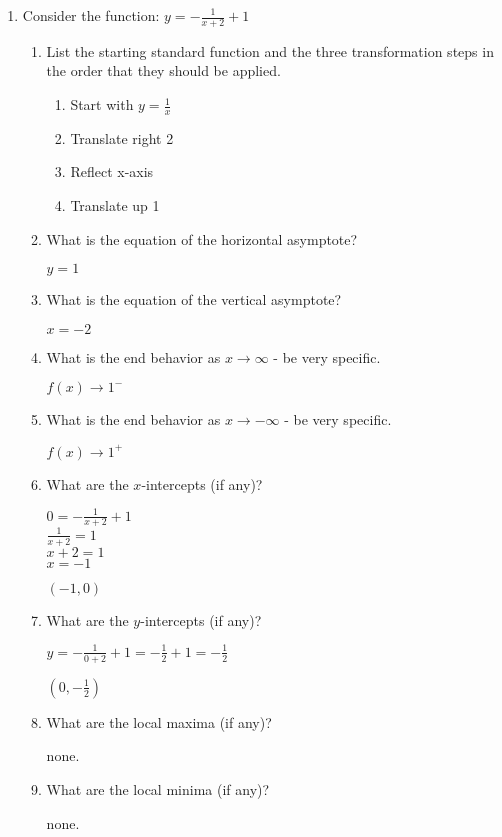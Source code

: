 \documentclass[letterpaper,12pt,fleqn]{article}
\begin{document}
\begin{enumerate}
\item Consider the function: $y=-\frac{1}{x+2}+1$
  \begin{enumerate}
  \item List the starting standard function and the three transformation
    steps in the order that they should be applied.
    \begin{enumerate}
    \item Start with $y=\frac{1}{x}$
    \item Translate right 2
    \item Reflect x-axis
    \item Translate up 1
    \end{enumerate}

  \item What is the equation of the horizontal asymptote?

    $y=1$

  \item What is the equation of the vertical asymptote?

    $x=-2$

  \item What is the end behavior as $x\to\infty$ - be very specific.

    $f(x)\to1^-$

  \item What is the end behavior as $x\to-\infty$ - be very specific.

    $f(x)\to1^+$

  \item What are the $x$-intercepts (if any)?

    $0=-\frac{1}{x+2}+1$ \\
    $\frac{1}{x+2}=1$ \\
    $x+2=1$ \\
    $x=-1$

    $(-1,0)$
    
  \item What are the $y$-intercepts (if any)?

    $y=-\frac{1}{0+2}+1=-\frac{1}{2}+1=-\frac{1}{2}$

    $(0,-\frac{1}{2})$

  \item What are the local maxima (if any)?

    none.

  \item What are the local minima (if any)?

    none.


\end{enumerate}
\end{enumerate}
\end{document}

